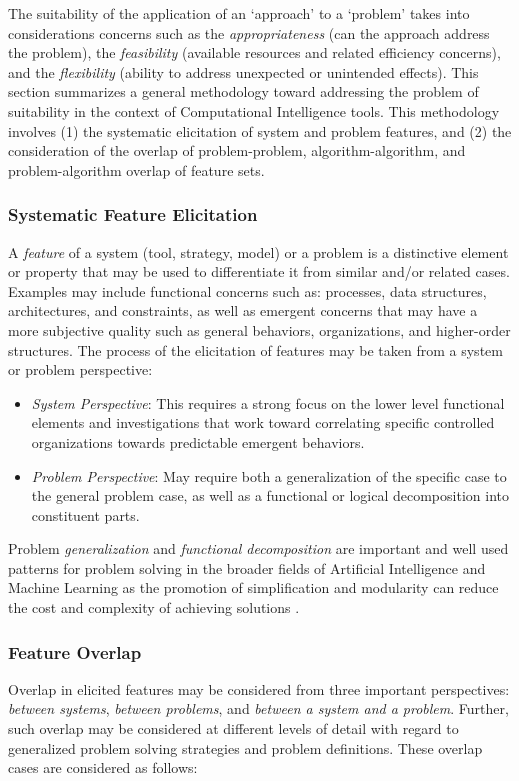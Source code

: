 The suitability of the application of an `approach' to a `problem' takes into considerations concerns such as the \emph{appropriateness} (can the approach address the problem), the \emph{feasibility} (available resources and related efficiency concerns), and the \emph{flexibility} (ability to address unexpected or unintended effects).
This section summarizes a general methodology toward addressing the problem of suitability in the context of Computational Intelligence tools. This methodology involves (1) the systematic elicitation of system and problem features, and (2) the consideration of the overlap of problem-problem, algorithm-algorithm, and problem-algorithm overlap of feature sets. 

\subsubsection{Systematic Feature Elicitation}
A \emph{feature} of a system (tool, strategy, model) or a problem is a distinctive element or property that may be used to differentiate it from similar and/or related cases. Examples may include functional concerns such as: processes, data structures, architectures, and constraints, as well as emergent concerns that may have a more subjective quality such as general behaviors, organizations, and higher-order structures. The process of the elicitation of features may be taken from a system or problem perspective:

\begin{itemize}
	\item \emph{System Perspective}: This requires a strong focus on the lower level functional elements and investigations that work toward correlating specific controlled organizations towards predictable emergent behaviors. 
	\item \emph{Problem Perspective}: May require both a generalization of the specific case to the general problem case, as well as a functional or logical decomposition into constituent parts.
\end{itemize}

Problem \emph{generalization} and \emph{functional decomposition} are important and well used patterns for problem solving in the broader fields of Artificial Intelligence and Machine Learning as the promotion of simplification and modularity can reduce the cost and complexity of achieving solutions \cite{Russell2009, Brooks1986}.

%
%
\subsubsection{Feature Overlap}
Overlap in elicited features may be considered from three important perspectives: \emph{between systems}, \emph{between problems}, and \emph{between a system and a problem}. Further, such overlap may be considered at different levels of detail with regard to generalized problem solving strategies and problem definitions.
These overlap cases are considered as follows:

